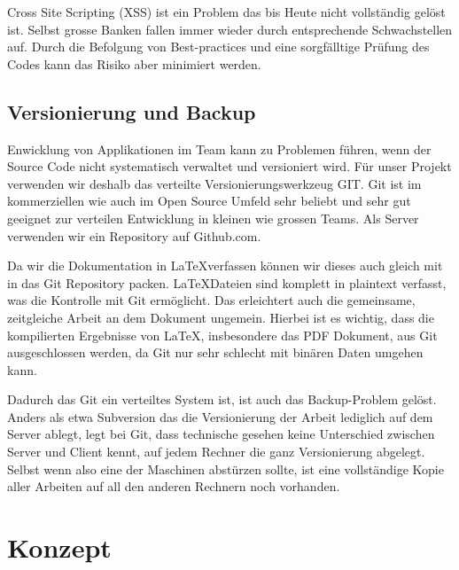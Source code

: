 \documentclass[11pt,paper=a4,final]{scrartcl}
\begin{document}
Cross Site Scripting (XSS) ist ein Problem das bis Heute nicht vollst\"andig
gel\"ost ist. Selbst grosse Banken fallen immer wieder durch entsprechende
Schwachstellen auf.\cite{heise:banken-xss} Durch die Befolgung von Best-practices und
eine sorgf\"alltige Pr\"ufung des Codes kann das Risiko aber minimiert werden.
\subsection{Versionierung und Backup}
Enwicklung von Applikationen im Team kann zu Problemen f\"uhren, wenn der Source
Code nicht systematisch verwaltet und versioniert wird. F\"ur unser Projekt
verwenden wir deshalb das verteilte Versionierungswerkzeug GIT. Git ist im
kommerziellen wie auch im Open Source Umfeld sehr beliebt und sehr gut geeignet
zur verteilen Entwicklung in kleinen wie grossen Teams. Als Server verwenden wir
ein Repository auf Github.com.

Da wir die Dokumentation in \LaTeX verfassen k\"onnen wir dieses auch gleich mit
in das Git Repository packen. \LaTeX Dateien sind komplett in plaintext
verfasst, was die Kontrolle mit Git erm\"oglicht. Das erleichtert auch die
gemeinsame, zeitgleiche Arbeit an dem Dokument ungemein. Hierbei ist es wichtig,
dass die kompilierten Ergebnisse von \LaTeX, insbesondere das PDF Dokument, aus
Git ausgeschlossen werden, da Git nur sehr schlecht mit bin\"aren Daten umgehen
kann.

Dadurch das Git ein verteiltes System ist, ist auch das Backup-Problem gel\"ost.
Anders als etwa Subversion das die Versionierung der Arbeit lediglich auf dem
Server ablegt, legt bei Git, dass technische gesehen keine Unterschied zwischen
Server und Client kennt, auf jedem Rechner die ganz Versionierung abgelegt.
Selbst wenn also eine der Maschinen abst\"urzen sollte, ist eine vollst\"andige
Kopie aller Arbeiten auf all den anderen Rechnern noch vorhanden.

\section{Konzept}
\label{sec:konzept}
\end{document}
